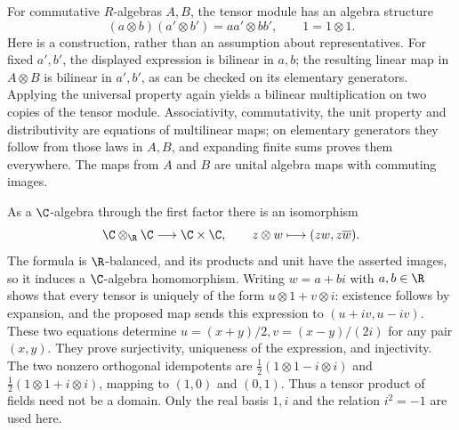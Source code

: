For commutative $R$-algebras $A,B$, the tensor module has an algebra
structure
\[
 (a\otimes b)(a'\otimes b')=aa'\otimes bb',\qquad1=1\otimes1.
\]
Here is a construction, rather than an assumption about representatives.
For fixed $a',b'$, the displayed expression is bilinear in $a,b$;
the resulting linear map in $A\otimes B$ is bilinear in $a',b'$,
as can be checked on its elementary generators. Applying the universal
property again yields a bilinear multiplication on two copies of the
tensor module. Associativity, commutativity, the unit property and
distributivity are equations of multilinear maps; on elementary
generators they follow from those laws in $A,B$, and expanding finite
sums proves them everywhere. The maps from $A$ and $B$ are unital
algebra maps with commuting images.

As a $\C$-algebra through the first factor there is an isomorphism
\[
 \C\otimes_\R\C\longrightarrow\C\times\C,\qquad
 z\otimes w\longmapsto(zw,z\overline w).
\]
The formula is $\R$-balanced, and its products and unit have the asserted
images, so it induces a $\C$-algebra homomorphism.
Writing $w=a+bi$ with $a,b\in\R$ shows that every tensor is uniquely of
the form $u\otimes1+v\otimes i$: existence follows by expansion, and
the proposed map sends this expression to $(u+iv,u-iv)$.
These two equations determine
$u=(x+y)/2,v=(x-y)/(2i)$ for any pair $(x,y)$.
They prove surjectivity, uniqueness of the expression, and injectivity.
The two nonzero orthogonal idempotents are
$\tfrac12(1\otimes1-i\otimes i)$ and
$\tfrac12(1\otimes1+i\otimes i)$, mapping to $(1,0)$ and $(0,1)$.
Thus a tensor product of fields need not be a domain. Only the real
basis $1,i$ and the relation $i^2=-1$ are used here.

